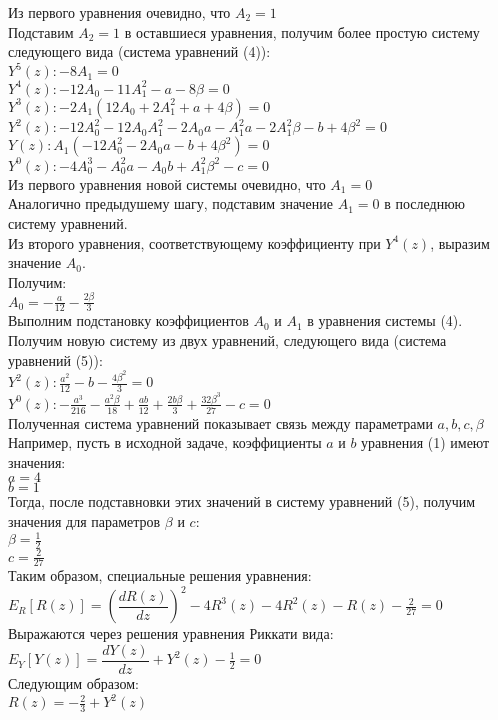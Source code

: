 \documentclass[12pt,a4paper,draft]{letter}
\begin{document}
Из первого уравнения очевидно, что $A_2 = 1$ \\
Подставим $A_2 = 1$ в оставшиеся уравнения, получим более простую систему следующего вида (система уравнений (4)): 
\\
$Y^5(z): -8 A_1= 0$\\
$Y^4(z): -12 A_0 - 11 A_1^2 - a - 8 \beta= 0$\\
$Y^3(z):  -2 A_1 (12 A_0 + 2 A_1^2 + a + 4 \beta)= 0$\\
$Y^2(z):  -12 A_0^2 - 12 A_0 A_1^2 - 2 A_0 a - A_1^2 a - 2 A_1^2 \beta - b + 4 \beta^2= 0$\\
$Y(z):  A_1 (-12 A_0^2 - 2 A_0 a - b + 4 \beta^2)= 0$\\
$Y^0(z):  -4 A_0^3 - A_0^2 a - A_0 b + A_1^2 \beta^2 - c= 0$\\
Из первого уравнения новой системы очевидно, что $A_1 = 0$\\
Аналогично предыдушему шагу, подставим значение $A_1 = 0$ в последнюю систему уравнений.\\
Из второго уравнения, соответствующему коэффициенту при $Y^4(z)$, выразим значение $A_0$.\\
Получим:\\
$A_0 = -\frac{a}{12} - \frac{2 \beta}{3}$\\
Выполним подстановку коэффициентов $A_0$ и $A_1$ в уравнения системы (4).
Получим новую систему из двух уравнений, следующего вида (система уравнений (5)):\\
$Y^2(z): \frac{a^2}{12} - b - \frac{4 \beta^2}{3} = 0$\\
$Y^0(z): -\frac{a^3}{216} - \frac{a^2 \beta}{18} + \frac{a b}{12} + \frac{2 b \beta}{3} + \frac{32 \beta^3}{27} - c = 0$\\
Полученная система уравнений показывает связь между параметрами $a, b, c, \beta$\\
Например, пусть в исходной задаче, коэффициенты $a$ и $b$ уравнения (1) имеют значения:\\
$a = 4$\\
$b = 1$\\
Тогда, после подставновки этих значений в систему уравнений (5), получим значения для параметров $\beta$ и $c$:\\
$\beta = \frac{1}{2}$\\
$c = \frac{2}{27}$\\
Таким образом, специальные решения уравнения:
$E_R [R(z)] = \left(\dfrac{dR(z)}{dz}\right)^2 - 4R^3(z) - 4 R^2(z) - R(z) - \frac{2}{27} = 0$\\
Выражаются через решения уравнения Риккати вида:
$E_Y [Y(z)] = \dfrac{dY(z)}{dz} + Y^2(z) - \frac{1}{2} = 0$\\
Следующим образом:\\
$R(z) = -\frac{2}{3} + Y^2(z)$\\                                                                  
\end{document}
